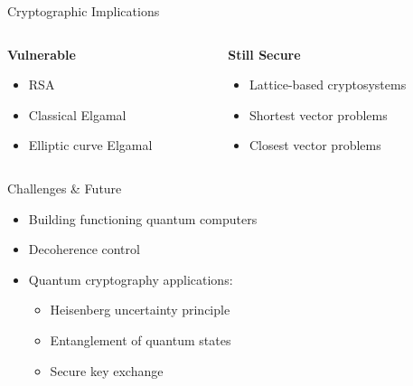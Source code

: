 \documentclass{beamer}
\begin{document}
\begin{frame}{Cryptographic Implications}
    \begin{columns}
        \begin{column}{0.5\textwidth}
            \textbf{Vulnerable}
            \begin{itemize}
                \item RSA
                \item Classical Elgamal
                \item Elliptic curve Elgamal
            \end{itemize}
        \end{column}
		\pause
        \begin{column}{0.5\textwidth}
            \textbf{Still Secure}
            \begin{itemize}
                \item Lattice-based cryptosystems
                \item Shortest vector problems
                \item Closest vector problems
            \end{itemize}
        \end{column}
    \end{columns}
\end{frame}




\begin{frame}{Challenges \& Future}
    \begin{itemize}
        \item Building functioning quantum computers
        \item Decoherence control
        \item Quantum cryptography applications:
            \begin{itemize}
                \item Heisenberg uncertainty principle
                \item Entanglement of quantum states
                \item Secure key exchange
            \end{itemize}
    \end{itemize}
\end{frame}
\end{document}
